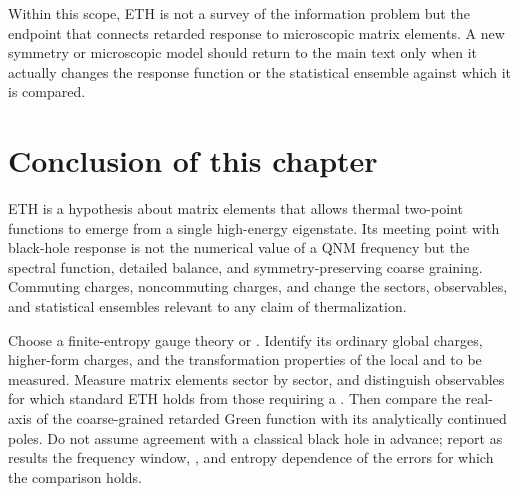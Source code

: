 Within this scope, ETH is not a survey of the information problem but the endpoint that connects retarded response to microscopic matrix elements. A new symmetry or microscopic model should return to the main text only when it actually changes the response function or the statistical ensemble against which it is compared.

\section{Conclusion of this chapter}

ETH is a hypothesis about matrix elements that allows thermal two-point functions to emerge from a single high-energy eigenstate. Its meeting point with black-hole response is not the numerical value of a QNM frequency but the spectral function, detailed balance, and symmetry-preserving coarse graining. Commuting charges, noncommuting charges, and  change the sectors, observables, and statistical ensembles relevant to any claim of thermalization.

\begin{researchproblem}
Choose a finite-entropy gauge theory or . Identify its ordinary global charges, higher-form charges, and the transformation properties of the local and  to be measured. Measure matrix elements sector by sector, and distinguish observables for which standard ETH holds from those requiring a . Then compare the real-axis  of the coarse-grained retarded Green function with its analytically continued poles. Do not assume agreement with a classical black hole in advance; report as results the frequency window, , and entropy dependence of the errors for which the comparison holds.
\end{researchproblem}
